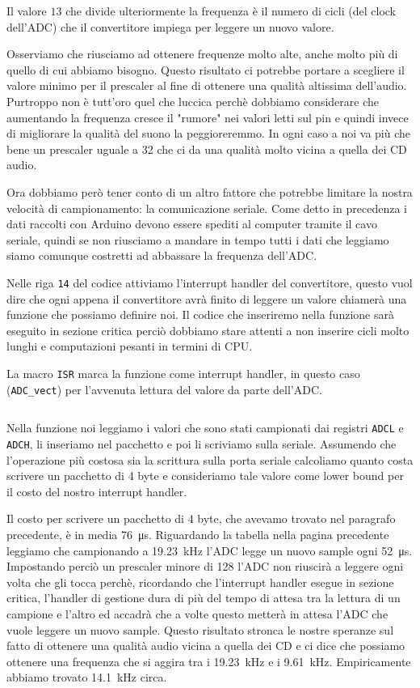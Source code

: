 \documentclass[a4paper,11pt]{article}
\newcommand\source[2]{
	\inputminted[fontsize=\footnotesize,linenos=true,tabsize=4]{#1}{#2}
}
\begin{document}
Il valore $13$ che divide ulteriormente la frequenza è il numero di cicli (del clock dell'ADC) che il convertitore impiega per leggere un nuovo valore.

Osserviamo che riusciamo ad ottenere frequenze molto alte, anche molto più di quello di cui abbiamo bisogno. Questo risultato ci potrebbe portare a scegliere il valore minimo per il prescaler al fine di ottenere una qualità altissima dell'audio. Purtroppo non è tutt'oro quel che luccica perchè dobbiamo considerare che aumentando la frequenza cresce il "rumore" nei valori letti sul pin e quindi invece di migliorare la qualità del suono la peggioreremmo. In ogni caso a noi va più che bene un prescaler uguale a 32 che ci da una qualità molto vicina a quella dei CD audio.

Ora dobbiamo però tener conto di un altro fattore che potrebbe limitare la nostra velocità di campionamento: la comunicazione seriale.
Come detto in precedenza i dati raccolti con Arduino devono essere spediti al computer tramite il cavo seriale, quindi se non riusciamo a mandare in tempo tutti i dati che leggiamo siamo comunque costretti ad abbassare la frequenza dell'ADC.

Nelle riga \texttt{14} del codice attiviamo l'interrupt handler del convertitore, questo vuol dire che ogni appena il convertitore avrà finito di leggere un valore chiamerà una funzione che possiamo definire noi. Il codice che inseriremo nella funzione sarà eseguito in sezione critica perciò dobbiamo stare attenti a non inserire cicli molto lunghi e computazioni pesanti in termini di CPU.

La macro \texttt{ISR} marca la funzione come interrupt handler, in questo caso (\texttt{ADC\_vect}) per l'avvenuta lettura del valore da parte dell'ADC.

\source{cpp}{adc_interrupt_rel}

Nella funzione noi leggiamo i valori che sono stati campionati dai registri \texttt{ADCL} e \texttt{ADCH}, li inseriamo nel pacchetto e poi li scriviamo sulla seriale. Assumendo che l'operazione più costosa sia la scrittura sulla porta seriale calcoliamo quanto costa scrivere un pacchetto di 4 byte e consideriamo tale valore come lower bound per il costo del nostro interrupt handler.

Il costo per scrivere un pacchetto di 4 byte, che avevamo trovato nel paragrafo precedente, è in media \SI{76}{\micro\second}. Riguardando la tabella nella pagina precedente leggiamo che campionando a \SI{19.23}{\kilo\hertz} l'ADC legge un nuovo sample ogni \SI{52}{\micro\second}. Impostando perciò un prescaler minore di 128 l'ADC non riuscirà a leggere ogni volta che gli tocca perchè, ricordando che l'interrupt handler esegue in sezione critica, l'handler di gestione dura di più del tempo di attesa tra la lettura di un campione e l'altro ed accadrà che a volte questo metterà in attesa l'ADC che vuole leggere un nuovo sample. 
Questo risultato stronca le nostre speranze sul fatto di ottenere una qualità audio vicina a quella dei CD e ci dice che possiamo ottenere una frequenza che si aggira tra i \SI{19.23}{\kilo\hertz} e i \SI{9.61}{\kilo\hertz}. Empiricamente abbiamo trovato \SI{14.1}{\kilo\hertz} circa.
\end{document}
